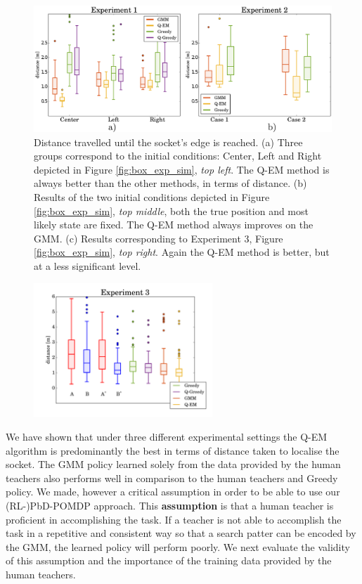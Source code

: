 \begin{figure}
 \centering
    \includegraphics[width=\textwidth]{./ch4-PiH/Figures/Fig/experiment_1_2.pdf}
   \caption{Distance travelled until the socket's edge is reached. (a) Three groups correspond to the initial conditions: Center, Left and Right
   depicted in Figure \ref{fig:box_exp_sim}, \textit{top left}. The Q-EM method is always better than the other methods, in terms of distance. (b)
   Results of the two initial conditions depicted in Figure \ref{fig:box_exp_sim}, \textit{top middle}, both the true position and most likely state are
   fixed. The Q-EM method always improves on the GMM. (c) Results corresponding to Experiment 3, Figure \ref{fig:box_exp_sim}, \textit{top right}.
   Again the Q-EM method is better, but at a less significant level.}
   \label{fig:three_searches}
\end{figure}
\begin{figure}
 \centering
  \includegraphics[width=0.6\textwidth]{./ch4-PiH/Figures/Fig/experiment3_plot2.pdf}
  \caption{}
\end{figure}
 

We have shown that under three different experimental settings the Q-EM algorithm is predominantly the best in terms of distance taken 
to localise the socket. The GMM policy learned solely from the data provided by the human teachers also performs well in comparison to  
the human teachers and Greedy policy. We made, however a critical assumption in order to be able to use our (RL-)PbD-POMDP approach. 
This \textbf{assumption} is that a human teacher is proficient in accomplishing the task. If a teacher is not able to accomplish 
the task in a repetitive and consistent way so that a search patter can be encoded by the GMM, the learned policy will perform poorly.
We next evaluate the validity of this assumption and the importance of the training data provided by the human teachers.
% 
